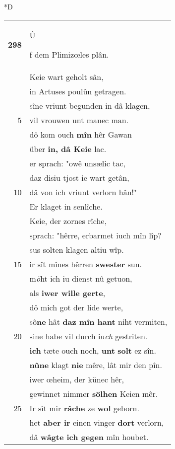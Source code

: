 \documentclass[8pt,a4paper,notitlepage]{article}
\begin{document}
\begin{table}[ht]
\begin{minipage}[t]{0.5\linewidth}
\small
\begin{center}*D
\end{center}
\begin{tabular}{rl}
\textbf{298} & \begin{large}Û\end{large}f dem Plimizœles plân.\\ 
 & Keie wart geholt sân,\\ 
 & in Artuses poulûn getragen.\\ 
 & sîne vriunt begunden in dâ klagen,\\ 
5 & vil vrouwen unt manec man.\\ 
 & dô kom ouch \textbf{mîn} hêr Gawan\\ 
 & über \textbf{in, dâ Keie} lac.\\ 
 & er sprach: "owê unsælic tac,\\ 
 & daz disiu tjost ie wart getân,\\ 
10 & dâ von ich vriunt verlorn hân!"\\ 
 & Er klaget in senlîche.\\ 
 & Keie, der zornes rîche,\\ 
 & sprach: "hêrre, erbarmet iuch mîn lîp?\\ 
 & sus solten klagen altiu wîp.\\ 
15 & ir sît mînes hêrren \textbf{swester} sun.\\ 
 & m\textit{ö}ht ich iu dienst nû getuon,\\ 
 & als \textbf{iwer wille gerte},\\ 
 & dô mich got der lide werte,\\ 
 & sô\textbf{ne} hât \textbf{daz mîn hant} niht vermiten,\\ 
20 & sine habe vil durch iu\textit{ch} gestriten.\\ 
 & \textbf{ich} tæte ouch noch, \textbf{unt} \textbf{solt} ez sîn.\\ 
 & \textbf{nû}\textbf{ne} klagt \textbf{nie} mêre, lât mir den pîn.\\ 
 & iwer œheim, der künec hêr,\\ 
 & gewinnet nimmer \textbf{sölhen} Keien mêr.\\ 
25 & Ir sît mir \textbf{râche} ze \textbf{wol} geborn.\\ 
 & het \textbf{aber ir} einen vinger \textbf{dort} verlorn,\\ 
 & dâ \textbf{wâgte ich gegen} mîn houbet.\\ 

\end{tabular}
\end{minipage}
\end{table}
\end{document}
